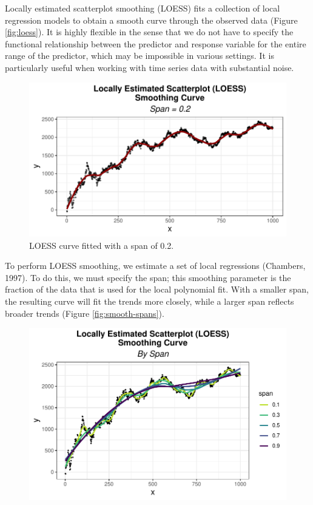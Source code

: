 \documentclass[12pt,twoside]{smiththesis}
\begin{document}
Locally estimated scatterplot smoothing (LOESS) fits a collection of local regression models to obtain a smooth curve through the observed data (Figure \ref{fig:loess}). It is highly flexible in the sense that we do not have to specify the functional relationship between the predictor and response variable for the entire range of the predictor, which may be impossible in various settings. It is particularly useful when working with time series data with substantial noise.
\begin{figure}

{\centering \includegraphics[width=1\linewidth]{thesis_files/figure-latex/unnamed-chunk-29-1} 

}

\caption{\label{fig:loess}LOESS curve fitted with  a span of 0.2. }\label{fig:unnamed-chunk-29}
\end{figure}
To perform LOESS smoothing, we estimate a set of local regressions (Chambers, 1997). To do this, we must specify the span; this smoothing parameter is the fraction of the data that is used for the local polynomial fit. With a smaller span, the resulting curve will fit the trends more closely, while a larger span reflects broader trends (Figure \ref{fig:smooth-spans}).
\begin{figure}

{\centering \includegraphics[width=1\linewidth]{thesis_files/figure-latex/unnamed-chunk-30-1} 

}

\caption{\label{fig:smooth-spans}}\label{fig:unnamed-chunk-30}
\end{figure}
\end{document}
